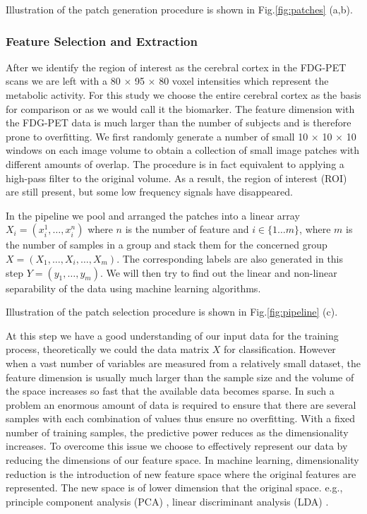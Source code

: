 \documentclass[authoryear,preprint,revi	ew,12pt]{elsarticle}
\begin{document}
Illustration of the patch generation procedure is shown in Fig.\ref{fig:patches} (a,b). 

\subsubsection{Feature Selection and Extraction}
\label{subsec:pipline}
After we identify the region of interest as the cerebral cortex in the FDG-PET scans we are left with a 80 $ \times $ 95 $ \times $ 80 voxel intensities which represent the metabolic activity. For this study we choose the entire cerebral cortex as the basis for comparison or as we would call it the biomarker. The feature dimension with the FDG-PET data is much larger than the number of subjects and is therefore prone to overfitting. We first randomly generate a number of small 10 $ \times $ 10 $ \times $ 10 windows on each image volume to obtain a collection of small image patches with different amounts of overlap. The procedure is in fact equivalent to applying a high-pass filter to the original volume. As a result, the region of interest (ROI) are still present, but some low frequency signals have disappeared. 

In the pipeline we pool and arranged the patches into a linear array $ X_i = (x^1_i,\dots,x^n_i) $ where $ n $ is the number of feature and $ i \in \{1 \dots m\} $, where $ m $ is the number of samples in a group and stack them for the concerned group $ X = (X_1,\dots,X_i,\dots,X_m) $. The corresponding labels are also generated in this step $ Y = (y_1,\dots,y_m) $. We will then try to find out the linear and non-linear separability of the data using machine learning algorithms.

Illustration of the patch selection procedure is shown in Fig.\ref{fig:pipeline} (c).

At this step we have a good understanding of our input data for the training process, theoretically we could the data matrix $ X $ for classification. However when a vast number of variables are measured from a relatively small dataset, the feature dimension is usually much larger than the sample size and the volume of the space increases so fast that the available data becomes sparse. In such a problem an enormous amount of data is required to ensure that there are several samples with each combination of values thus ensure no overfitting. With a fixed number of training samples, the predictive power reduces as the dimensionality increases. To overcome this issue we choose to effectively represent our data by reducing the dimensions of our feature space. In machine learning, dimensionality reduction is the introduction of new feature space where the original features are represented. The new space is of lower dimension that the original space. e.g., principle component analysis (PCA) \citep{jolliffe2002principal}, linear discriminant analysis (LDA) \citep{mika1999fisher}.
\end{document}
